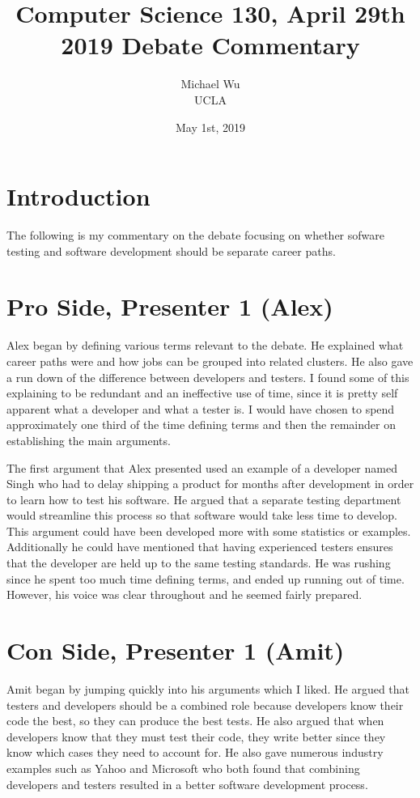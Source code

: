 \documentclass[letterpaper,twocolumn,10pt]{article}
\begin{document}
\title{Computer Science 130, April 29th 2019 Debate Commentary}
\date{May 1st, 2019}
\author{{\rm Michael Wu}\\UCLA} %
\maketitle
\section{Introduction}

The following is my commentary on the debate focusing on whether sofware testing
and software development should be separate career paths.

\section{Pro Side, Presenter 1 (Alex)}

Alex began by defining various terms relevant to the debate. He explained what career paths were
and how jobs can be grouped into related clusters. He also gave a run down of the difference between
developers and testers. I found some of this explaining to be redundant and an ineffective use of time,
since it is pretty self apparent what a developer and what a tester is. I would have chosen to spend approximately
one third of the time defining terms and then the remainder on establishing the main arguments.

The first argument that Alex presented used an example of a developer named Singh who had to delay shipping
a product for months after development in order to learn how to test his software. He argued that a separate
testing department would streamline this process so that software would take less time to develop. This
argument could have been developed more with some statistics or examples. Additionally he could have mentioned
that having experienced testers ensures that the developer are held up to the same testing standards.
He was rushing since he spent too much time defining terms, and ended up running out of time. However,
his voice was clear throughout and he seemed fairly prepared.

\section{Con Side, Presenter 1 (Amit)}

Amit began by jumping quickly into his arguments which I liked. He argued that testers and developers should
be a combined role because developers know their code the best, so they can produce the best tests. He
also argued that when developers know that they must test their code, they write better since they know
which cases they need to account for. He also gave numerous industry examples such as Yahoo and Microsoft
who both found that combining developers and testers resulted in a better software development process.
\end{document}
